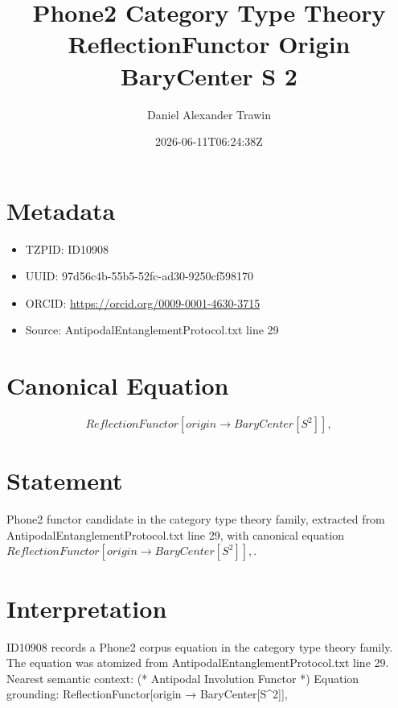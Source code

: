 \documentclass[11pt]{article}
\title{Phone2 Category Type Theory ReflectionFunctor Origin BaryCenter S 2}
\author{Daniel Alexander Trawin}
\date{2026-06-11T06:24:38Z}
\begin{document}
\maketitle
\section*{Metadata}
\begin{itemize}
\item TZPID: ID10908
\item UUID: 97d56c4b-55b5-52fc-ad30-9250cf598170
\item ORCID: \url{https://orcid.org/0009-0001-4630-3715}
\item Source: AntipodalEntanglementProtocol.txt line 29
\end{itemize}
\section*{Canonical Equation}
\[
ReflectionFunctor[origin → BaryCenter[S^2]],
\]
\section*{Statement}
Phone2 functor candidate in the category type theory family, extracted from AntipodalEntanglementProtocol.txt line 29, with canonical equation $ReflectionFunctor[origin → BaryCenter[S^2]],$.
\section*{Interpretation}
ID10908 records a Phone2 corpus equation in the category type theory family. The equation was atomized from AntipodalEntanglementProtocol.txt line 29. Nearest semantic context: (* Antipodal Involution Functor *) Equation grounding: ReflectionFunctor[origin → BaryCenter[S^2]],
\end{document}
